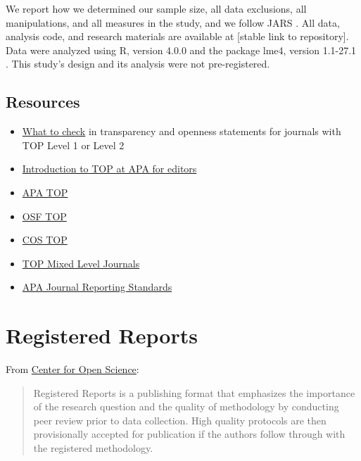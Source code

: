 \documentclass[
  oneside]{book}
\providecommand{\tightlist}{%
  \setlength{\itemsep}{0pt}\setlength{\parskip}{0pt}}
\begin{document}
We report how we determined our sample size, all data exclusions, all manipulations, and all measures in the study, and we follow JARS \citep{kazak2018journal}. All data, analysis code, and research materials are available at {[}stable link to repository{]}. Data were analyzed using R, version 4.0.0 \citep{R} and the package lme4, version 1.1-27.1 \citep{lme4}. This study's design and its analysis were not pre-registered.

\hypertarget{resources}{%
\section{Resources}\label{resources}}

\begin{itemize}
\tightlist
\item
  \href{https://www.dropbox.com/s/8jv2n0j3mlkhkrj/TOP_GuidanceforReviewers.docx}{What to check} in transparency and openness statements for journals with TOP Level 1 or Level 2
\item
  \href{https://www.dropbox.com/s/rx616egpte53o9m/TOP_at_APA_withScript.pdf}{Introduction to TOP at APA for editors}
\item
  \href{https://www.apa.org/pubs/journals/resources/transparency-openness-promotion}{APA TOP}
\item
  \href{https://osf.io/9f6gx/}{OSF TOP}
\item
  \href{https://www.cos.io/initiatives/top-guidelines}{COS TOP}
\item
  \href{https://docs.google.com/document/d/10cMB2IT406gPAgCAORa5_UVI6Plrwvl4XjTsd0Ya_4s/edit}{TOP Mixed Level Journals}
\item
  \href{https://apastyle.apa.org/jars}{APA Journal Reporting Standards}
\end{itemize}

\hypertarget{registered-reports}{%
\chapter{Registered Reports}\label{registered-reports}}

From \href{https://www.cos.io/initiatives/registered-reports}{Center for Open Science}:

\begin{quote}
Registered Reports is a publishing format that emphasizes the importance of the research question and the quality of methodology by conducting peer review prior to data collection. High quality protocols are then provisionally accepted for publication if the authors follow through with the registered methodology.
\end{quote}
\end{document}
